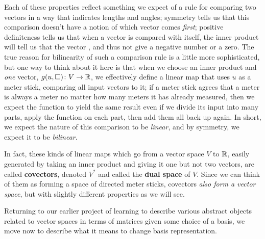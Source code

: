 \documentclass[11pt]{article}
\begin{document}
Each of these properties reflect something we expect of a rule for comparing two vectors in a way that indicates lengths and angles; symmetry tells us that this comparison doesn't have a notion of which vector comes \emph{first}; positive definiteness tells us that when a vector is compared with itself, the inner product will tell us that the vector , and thus not give a negative number or a zero. The true reason for bilinearity of such a comparison rule is a little more sophisticated, but one way to think about it here is that when we choose an inner product and \emph{one} vector, $g(u, \square)\colon V \to \mathbb{R}$, we effectively define a linear map that uses $u$ as a meter stick, comparing all input vectors to it; if a meter stick agrees that a meter is always a meter no matter how many meters it has already measured, then we expect the function to yield the same result even if we divide its input into many parts, apply the function on each part, then add them all back up again. In short, we expect the nature of this comparison to be \emph{linear}, and by symmetry, we expect it to be \emph{bilinear}.


In fact, these kinds of linear maps which go from a vector space $V$ to $\mathbb{R}$, easily generated by taking an inner product and giving it one but not two vectors, are called \textbf{covectors}, denoted $V^*$ and called the \textbf{dual space} of $V$. Since we can think of them as forming a space of directed meter sticks, covectors \emph{also form a vector space}, but with slightly different properties as we will see.

Returning to our earlier project of learning to describe various abstract objects related to vector spaces in terms of matrices given some choice of a basis, we move now to describe what it means to change basis representation.
\end{document}
